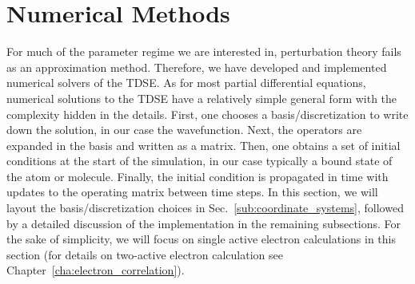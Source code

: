 
\section{Numerical Methods} %
\label{sec:numerical_methods}
For much of the parameter regime we are interested in, perturbation theory fails as an approximation method. Therefore, we have developed and implemented numerical solvers of the TDSE. As for most partial differential equations, numerical solutions to the TDSE have a relatively simple general form with the complexity hidden in the details. First, one chooses a basis/discretization to write down the solution, in our case the wavefunction. Next, the operators are expanded in the basis and written as a matrix. Then, one obtains a set of initial conditions at the start of the simulation, in our case typically a bound state of the atom or molecule. Finally, the initial condition is propagated in time with updates to the operating matrix between time steps. In this section, we will layout the basis/discretization choices in Sec.~\ref{sub:coordinate_systems}, followed by a detailed discussion of the implementation in the remaining subsections. For the sake of simplicity, we will focus on single active electron calculations in this section (for details on two-active electron calculation see Chapter~\ref{cha:electron_correlation}).



